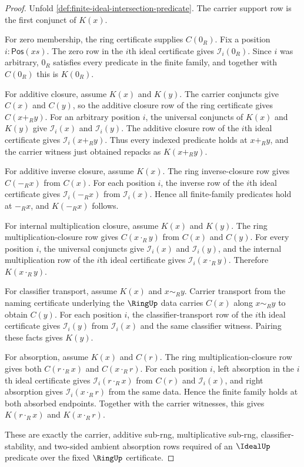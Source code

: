 \begin{proof}
Unfold \autoref{def:finite-ideal-intersection-predicate}. The carrier support row is the first conjunct of $K(x)$.

For zero membership, the ring certificate supplies $C(0_R)$. Fix a position $i:\mathsf{Pos}(xs)$. The zero row in the $i$th ideal certificate gives $\mathcal{I}_i(0_R)$. Since $i$ was arbitrary, $0_R$ satisfies every predicate in the finite family, and together with $C(0_R)$ this is $K(0_R)$.

For additive closure, assume $K(x)$ and $K(y)$. The carrier conjuncts give $C(x)$ and $C(y)$, so the additive closure row of the ring certificate gives $C(x+_R y)$. For an arbitrary position $i$, the universal conjuncts of $K(x)$ and $K(y)$ give $\mathcal{I}_i(x)$ and $\mathcal{I}_i(y)$. The additive closure row of the $i$th ideal certificate gives $\mathcal{I}_i(x+_R y)$. Thus every indexed predicate holds at $x+_R y$, and the carrier witness just obtained repacks as $K(x+_R y)$.

For additive inverse closure, assume $K(x)$. The ring inverse-closure row gives $C(-_R x)$ from $C(x)$. For each position $i$, the inverse row of the $i$th ideal certificate gives $\mathcal{I}_i(-_R x)$ from $\mathcal{I}_i(x)$. Hence all finite-family predicates hold at $-_R x$, and $K(-_R x)$ follows.

For internal multiplication closure, assume $K(x)$ and $K(y)$. The ring multiplication-closure row gives $C(x\cdot_R y)$ from $C(x)$ and $C(y)$. For every position $i$, the universal conjuncts give $\mathcal{I}_i(x)$ and $\mathcal{I}_i(y)$, and the internal multiplication row of the $i$th ideal certificate gives $\mathcal{I}_i(x\cdot_R y)$. Therefore $K(x\cdot_R y)$.

For classifier transport, assume $K(x)$ and $x\sim_R y$. Carrier transport from the naming certificate underlying the $\RingUp$ data carries $C(x)$ along $x\sim_R y$ to obtain $C(y)$. For each position $i$, the classifier-transport row of the $i$th ideal certificate gives $\mathcal{I}_i(y)$ from $\mathcal{I}_i(x)$ and the same classifier witness. Pairing these facts gives $K(y)$.

For absorption, assume $K(x)$ and $C(r)$. The ring multiplication-closure row gives both $C(r\cdot_R x)$ and $C(x\cdot_R r)$. For each position $i$, left absorption in the $i$th ideal certificate gives $\mathcal{I}_i(r\cdot_R x)$ from $C(r)$ and $\mathcal{I}_i(x)$, and right absorption gives $\mathcal{I}_i(x\cdot_R r)$ from the same data. Hence the finite family holds at both absorbed endpoints. Together with the carrier witnesses, this gives $K(r\cdot_R x)$ and $K(x\cdot_R r)$.

These are exactly the carrier, additive sub-rng, multiplicative sub-rng, classifier-stability, and two-sided ambient absorption rows required of an $\IdealUp$ predicate over the fixed $\RingUp$ certificate.
\end{proof}

